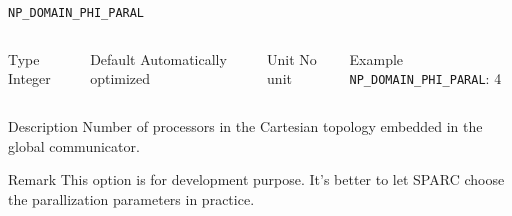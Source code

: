 \begin{frame}[allowframebreaks]{\texttt{NP\_DOMAIN\_PHI\_PARAL}} \label{NP_DOMAIN_PHI_PARAL}
\vspace*{-12pt}
\begin{columns}
\begin{block}{Type}
Integer
\end{block}

\begin{block}{Default}
Automatically optimized
\end{block}

\begin{block}{Unit}
No unit
\end{block}

\begin{block}{Example}
\texttt{NP\_DOMAIN\_PHI\_PARAL}: 4
\end{block}
\end{columns}

\begin{block}{Description}
Number of processors in the Cartesian topology embedded in the global communicator.
\end{block}

\begin{block}{Remark}
This option is for development purpose. It's better to let SPARC choose the parallization parameters in practice.
\end{block}
\end{frame}


